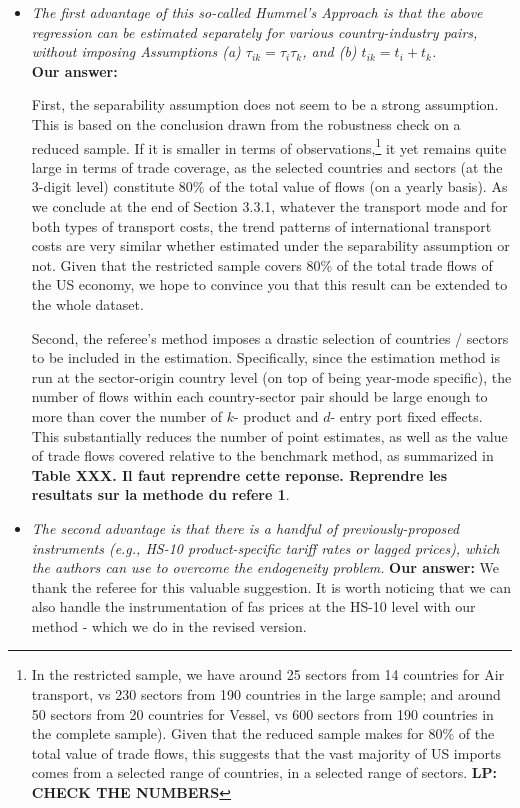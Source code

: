 \documentclass[a4paper,11pt]{article}
\begin{document}
\begin{itemize}
\item \textit{The first advantage of this so-called Hummel's Approach is that the above
regression can be estimated separately for various country-industry pairs, without
imposing Assumptions (a) $\tau_{ik} = \tau_i\tau_{k}$, and (b) $t_{ik} = t_i+ t_{k}$.} \\

\textbf{Our answer:}

First, the separability assumption does not seem to be a strong assumption. This is based on the conclusion drawn from the robustness check on a reduced sample. If it is smaller in terms of observations,\footnote{In the restricted sample, we have around 25 sectors from 14 countries for Air transport, vs 230 sectors from 190 countries in the large sample; and around 50 sectors from 20 countries for Vessel, vs 600 sectors from 190 countries in the complete sample). Given that the reduced sample makes for 80\% of the total value of trade flows, this suggests that the vast majority of US imports comes from a selected range of countries, in a selected range of sectors. \textbf{LP: CHECK THE NUMBERS}} it yet remains quite large in terms of trade coverage, as the selected countries and sectors (at the 3-digit level) constitute 80\% of the total value of flows (on a yearly basis). As we conclude at the end of Section 3.3.1, whatever the transport mode and for both types of transport costs, the trend patterns of international transport costs are very similar whether estimated under the separability assumption or not. Given that the restricted sample covers 80\% of the total trade flows of the US economy, we hope to convince you that this result can be extended to the whole dataset.


Second, the referee's method imposes a drastic selection of countries / sectors to be included in the estimation. Specifically, since the estimation method is run at the sector-origin country level (on top of being year-mode specific), the number of flows within each country-sector pair should be large enough to more than cover the number of $k$- product and $d$- entry port fixed effects. This substantially reduces the number of point estimates, as well as the value of trade flows covered relative to the  benchmark method, as summarized in \textbf{Table XXX. Il faut reprendre cette reponse. Reprendre les resultats sur la methode du refere 1}.



\item \textit{The second advantage is that there is a handful of previously-proposed instruments (e.g., HS-10 product-specific tariff rates or lagged prices), which the authors can use to overcome the endogeneity problem.} 
     \textbf{Our answer:}
We thank the referee for this valuable suggestion. It is worth noticing that we can also handle the instrumentation of fas prices at the HS-10 level with our method - which we do in the revised version.



\end{itemize}
\end{document}
